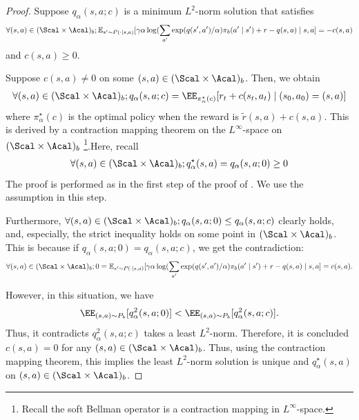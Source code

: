 \begin{proof}
Suppose $q_{\alpha}(s,a;c)$ is a minimum $L^2$-norm solution that satisfies 
\begin{align*}
   \forall (s,a) \in (\Scal \times \Acal)_b; \mathbb{E}_{s'\sim P(\cdot \mid s,a)}[\gamma \alpha \log(\sum_{a'} \exp(q(s',a')/\alpha)\pi_b(a'\mid s')+r-q(s,a)\mid s,a]=-c(s,a)
\end{align*}
 and $c(s,a)\geq 0$. 

 Suppose $c(s,a)\neq 0$ on some $(s,a) \in (\Scal \times \Acal)_b$. Then, we obtain 
 \begin{align*}
     \forall (s,a) \in (\Scal \times \Acal)_b;   q_{\alpha}(s,a;c) =  \EE_{\pi^{\star}_{\alpha}(c)}[r_t + c(s_t,a_t) \mid (s_0,a_0)=(s,a)]
 \end{align*}
 where $ \pi^{\star}_{\alpha}(c)$ is the optimal policy when the reward is $\tilde r(s,a)+c(s,a)$. This is derived by a contraction mapping theorem on the $L^{\infty}$-space on $(\Scal \times \Acal)_b$ \footnote{Recall the soft Bellman operator is a contraction mapping in $L^{\infty}$-space.  }.Here, recall 
 \begin{align*}
    \forall (s,a) \in (\Scal \times \Acal)_b;  q^{\star}_{\alpha}(s,a) = q_{\alpha}(s,a;0)\geq 0 
 \end{align*}
 The proof is performed as in the first step of the proof of . We use the assumption in this step. 
 
 Furthermore, $ \forall (s,a) \in (\Scal \times \Acal)_b;q_{\alpha}(s,a;0)\leq q_{\alpha}(s,a;c)$ clearly holds, and, especially, the strict inequality holds on some point in $(\Scal \times \Acal)_b$. This is because if $q_{\alpha}(s,a;0)= q_{\alpha}(s,a;c)$, we get the contradiction:
\begin{align*}
      \forall (s,a) \in (\Scal \times \Acal)_b; 0 = \mathbb{E}_{s'\sim P(\cdot \mid s,a)}[\gamma \alpha \log(\sum_{a'} \exp(q(s',a')/\alpha)\pi_b(a'\mid s')+r-q(s,a)\mid s,a]=c(s,a). 
\end{align*}

However, in this situation, we have 
\begin{align*}
    \EE_{(s,a)\sim P_b}[q^2_{\alpha}(s,a;0) ]<   \EE_{(s,a)\sim P_b}[q^2_{\alpha}(s,a;c) ]. 
\end{align*}
Thus, it contradicts $q^2_{\alpha}(s,a;c)$ takes a least $L^2$-norm. Therefore, it is concluded $c(s,a)=0$ for any $(s,a) \in (\Scal \times \Acal)_b$. Thus, using the contraction mapping theorem, this implies the least $L^2$-norm solution is unique and $q^{\star}_{\alpha}(s,a)$ on $(s,a) \in (\Scal \times \Acal)_b$. 


 
\end{proof}

